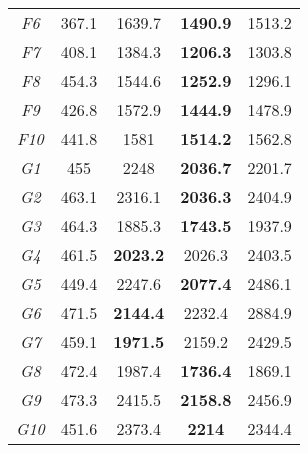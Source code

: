 {\begin{longtable}{ccccc}
\emph{F6}	&	367.1	&	1639.7		&	\textbf{1490.9}	&	1513.2	\\
\emph{F7}	&	408.1	&	1384.3		&	\textbf{1206.3}	&	1303.8	\\
\emph{F8}	&	454.3	&	1544.6		&	\textbf{1252.9}	&	1296.1	\\
\emph{F9}	&	426.8	&	1572.9		&	\textbf{1444.9}	&	1478.9	\\
\emph{F10}	&	441.8	&	1581		&	\textbf{1514.2}	&	1562.8	\\ \hline
\emph{G1}	&	455	&	2248		&	\textbf{2036.7}	&	2201.7	\\
\emph{G2}	&	463.1	&	2316.1		&	\textbf{2036.3}	&	2404.9	\\
\emph{G3}	&	464.3	&	1885.3		&	\textbf{1743.5}	&	1937.9	\\
\emph{G4}	&	461.5	&	\textbf{2023.2}		&	2026.3	&	2403.5	\\
\emph{G5}	&	449.4	&	2247.6		&	\textbf{2077.4}	&	2486.1	\\
\emph{G6}	&	471.5	&	\textbf{2144.4}		&	2232.4	&	2884.9	\\
\emph{G7}	&	459.1	&	\textbf{1971.5}		&	2159.2	&	2429.5	\\
\emph{G8}	&	472.4	&	1987.4		&	\textbf{1736.4}	&	1869.1	\\
\emph{G9}	&	473.3	&	2415.5		&	\textbf{2158.8}	&	2456.9	\\
\emph{G10}	&	451.6	&	2373.4		&	\textbf{2214}	&	2344.4	\\ \hline


        \hline
\end{longtable}
}